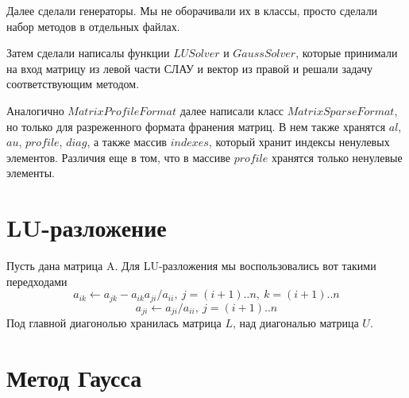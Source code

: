 Далее сделали генераторы. Мы не оборачивали их в классы, просто сделали набор методов в отдельных файлах.

Затем сделали написалы функции $LUSolver$ и $GaussSolver$, которые принимали на вход 
матрицу из левой части СЛАУ и вектор из правой и решали задачу соответствующим методом.

Аналогично $MatrixProfileFormat$ далее написали класс $MatrixSparseFormat$, но только для разреженного формата
франения матриц. В нем также хранятся $al$, $au$, $profile$, $diag$, а также массив $indexes$, 
который хранит индексы ненулевых элементов. Различия еще в том, что 
в массиве $profile$ хранятся только ненулевые элементы.


\section{LU-разложение}

Пусть дана матрица A. Для LU-разложения мы воспользовались вот такими передходами
$$a_{ik} \leftarrow a_{jk} - a_{ik}a_{ji}/a_{ii}, \ j = (i + 1)..n, \ k = (i + 1)..n$$
$$a_{ji} \leftarrow a_{ji}/a_{ii}, \ j = (i + 1)..n$$
Под главной диагонолью хранилась матрица $L$, над диагональю матрица $U$.
\\



\section{Метод Гаусса}